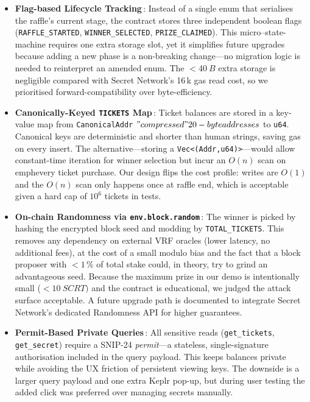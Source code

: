 \documentclass{article}
\begin{document}
\begin{itemize}
  \item \textbf{Flag-based Lifecycle Tracking}\,: Instead of a single enum that serialises the raffle's current stage, the contract stores three independent boolean flags (\texttt{RAFFLE\_STARTED}, \texttt{WINNER\_SELECTED}, \texttt{PRIZE\_CLAIMED}).  This micro–state-machine requires one extra storage slot, yet it simplifies future upgrades because adding a new phase is a non-breaking change—no migration logic is needed to reinterpret an amended enum.  The \(<40~B\) extra storage is negligible compared with Secret Network's 16\,k gas read cost, so we prioritised forward-compatibility over byte-efficiency.

  \item \textbf{Canonically-Keyed \texttt{TICKETS} Map}\,: Ticket balances are stored in a key-value map from \texttt{CanonicalAddr} \("compressed" 20-byte addresses\) to \texttt{u64}.  Canonical keys are deterministic and shorter than human strings, saving gas on every insert.  The alternative—storing a \texttt{Vec<(Addr,u64)>}—would allow constant-time iteration for winner selection but incur an \(O(n)\) scan on \\emph{every} ticket purchase.  Our design flips the cost profile:  writes are \(O(1)\) and the \(O(n)\) scan only happens once at raffle end, which is acceptable given a hard cap of \(10^{6}\) tickets in tests.

  \item \textbf{On-chain Randomness via \texttt{env.block.random}}\,: The winner is picked by hashing the encrypted block seed and modding by \texttt{TOTAL\_TICKETS}.  This removes any dependency on external VRF oracles (lower latency, no additional fees), at the cost of a small modulo bias and the fact that a block proposer with \(<1\,\%\) of total stake could, in theory, try to grind an advantageous seed.  Because the maximum prize in our demo is intentionally small (\(<10~SCRT)\) and the contract is educational, we judged the attack surface acceptable.  A future upgrade path is documented to integrate Secret Network's dedicated Randomness API for higher guarantees.

  \item \textbf{Permit-Based Private Queries}\,: All sensitive reads (\texttt{get\_tickets}, \texttt{get\_secret}) require a SNIP-24 \emph{permit}—a stateless, single-signature authorisation included in the query payload.  This keeps balances private while avoiding the UX friction of persistent viewing keys.  The downside is a larger query payload and one extra Keplr pop-up, but during user testing the added click was preferred over managing secrets manually.

\end{itemize}
\end{document}
